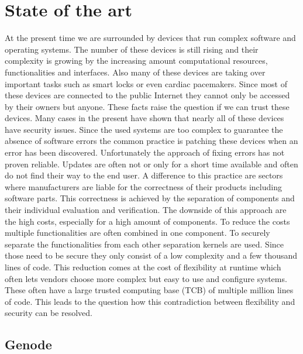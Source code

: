 \documentclass[
a4paper,
12pt,
notitlepage,
parskip=half,
DIV=11,
]{scrbook}
\begin{document}
	
	\tableofcontents
	
	\chapter{State of the art}
		At the present time we are surrounded by devices that run complex software and operating systems.
		The number of these devices is still rising and their complexity is growing by the increasing amount computational resources, functionalities and interfaces.
		Also many of these devices are taking over important tasks such as smart locks or even cardiac pacemakers.
		Since most of these devices are connected to the public Internet they cannot only be accessed by their owners but anyone.
		These facts raise the question if we can trust these devices.
		Many cases in the present have shown that nearly all of these devices have security issues.
		Since the used systems are too complex to guarantee the absence of software errors the common practice is patching these devices when an error has been discovered.
		Unfortunately the approach of fixing errors has not proven reliable.
		Updates are often not or only for a short time available and often do not find their way to the end user.
		A difference to this practice are sectors where manufacturers are liable for the correctness of their products including software parts.
		This correctness is achieved by the separation of components and their individual evaluation and verification.
		The downside of this approach are the high costs, especially for a high amount of components.
		To reduce the costs multiple functionalities are often combined in one component.
		To securely separate the functionalities from each other separation kernels are used.
		Since those need to be secure they only consist of a low complexity and a few thousand lines of code.
		This reduction comes at the cost of flexibility at runtime which often lets vendors choose more complex but easy to use and configure systems.
		These often have a large trusted computing base (TCB) of multiple million lines of code.
		This leads to the question how this contradiction between flexibility and security can be resolved.
		
		\section{Genode}
		
\end{document}

